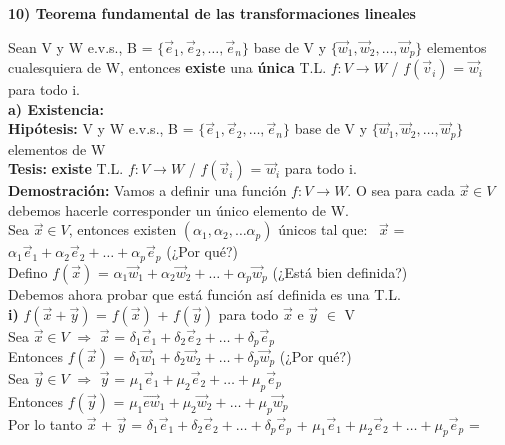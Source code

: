 \documentclass[11pt]{article}
\begin{document}
\vspace{2mm} \noindent
{\Large \bfseries{10) Teorema fundamental de las transformaciones lineales}}

\vspace{2mm} \noindent
Sean V y W e.v.s., B = $\{\vec{e}_1, \vec{e}_2, \hdots, \vec{e}_n\}$ base de V y $\{\vec{w}_1, \vec{w}_2, \hdots, \vec{w}_p\}$ elementos cualesquiera de W, entonces {\bfseries existe} una {\bfseries única} T.L. $f: V \rightarrow W$ / $f(\vec{v}_i)$ = $\vec{w}_i$ para todo i. \\
{\bfseries a) Existencia:} \\
{\bfseries Hipótesis:} V y W e.v.s., B = $\{\vec{e}_1, \vec{e}_2, \hdots, \vec{e}_n\}$ base de V y $\{\vec{w}_1, \vec{w}_2, \hdots, \vec{w}_p\}$ elementos de W \\
{\bfseries Tesis:} {\bfseries existe} T.L. $f: V \rightarrow W$ / $f(\vec{v}_i)$ = $\vec{w}_i$ para todo i. \\
{\bfseries Demostración:} Vamos a definir una función $f: V \rightarrow W$. O sea para cada $\vec{x} \in V$ debemos hacerle corresponder un único elemento de W. \\
Sea $\vec{x} \in V$, entonces existen $(\alpha_1, \alpha_2, \hdots \alpha_p)$ únicos tal que: \
$\vec{x}$ = $\alpha_1 \vec{e}_1 + \alpha_2 \vec{e}_2 + \hdots + \alpha_p \vec{e}_p$ (¿Por qué?)\\
Defino $f(\vec{x})$ = $\alpha_1 \vec{w}_1 + \alpha_2 \vec{w}_2 + \hdots + \alpha_p \vec{w}_p$ (¿Está bien definida?) \\
Debemos ahora probar que está función así definida es una T.L. \\
{\bfseries i)} $f(\vec{x} + \vec{y})$ = $f(\vec{x})$ + $f(\vec{y})$ para todo $\vec{x}$ e $\vec{y}$ $\in$ V \\
Sea $\vec{x} \in V$ $\Rightarrow$ $\vec{x}$ = $\delta_1\vec{e}_1 + \delta_2 \vec{e}_2 + \hdots + \delta_p \vec{e}_p$ \\
Entonces $f(\vec{x})$ = $\delta_1\vec{w}_1 + \delta_2 \vec{w}_2 + \hdots + \delta_p \vec{w}_p$ (¿Por qué?) \\
Sea $\vec{y} \in V$ $\Rightarrow$ $\vec{y}$ = $\mu_1\vec{e}_1 + \mu_2 \vec{e}_2 + \hdots + \mu_p \vec{e}_p$ \\
Entonces $f(\vec{y})$ = $\mu_1\vec{ew}_1 + \mu_2 \vec{w}_2 + \hdots + \mu_p \vec{w}_p$ \\
Por lo tanto $\vec{x}$ + $\vec{y}$ = $\delta_1\vec{e}_1 + \delta_2 \vec{e}_2 + \hdots + \delta_p \vec{e}_p$ + $\mu_1\vec{e}_1 + \mu_2 \vec{e}_2 + \hdots + \mu_p \vec{e}_p$ = \\
\end{document}
